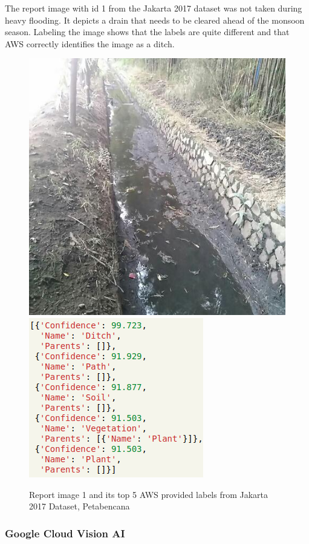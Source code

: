 The report image with id 1 from the Jakarta 2017 dataset was not taken during
heavy flooding. It depicts a drain that needs to be cleared ahead of the
monsoon season. Labeling the image shows that the labels are quite different and
that AWS correctly identifies the image as a ditch.
\begin{figure}[ht]
    \centering
    \captionsetup{justification=centering}
    \includegraphics[scale=0.3]{images/id/1.jpeg}
    \includegraphics[scale=0.6]{images/id/aws_1.png}
    \caption{Report image 1 and its top 5 AWS provided labels from Jakarta
    2017 Dataset, Petabencana }\label{fig:aws_1}
\end{figure}


\subsubsection{Google Cloud Vision AI}

